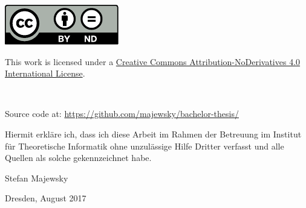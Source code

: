 \documentclass[
 paper=A4,pagesize=automedia,fontsize=12pt,
 BCOR=10mm,DIV=16,
 twoside,headinclude,footinclude=false,
 bibtotocnumbered,          %
 liststotoc,                %
 listsleft,
 pointlessnumbers,          %
 cleardoublepage=empty      %
]{scrbook}
\theoremstyle{plain}
\theoremstyle{definition}
\numberwithin{theorem}{chapter}
\numberwithin{equation}{chapter}
\numberwithin{figure}{chapter}
\numberwithin{table}{chapter}
\begin{document}
\begin{titlepage}
 \vspace*{5em}
 \begin{singlespace}
  \hspace{0.18\linewidth}
  \begin{minipage}{0.1\linewidth}
   \includegraphics[width=\linewidth]{img/by-nd.pdf}
  \end{minipage}
  \hspace{0.02\linewidth}
  \begin{minipage}{0.6\linewidth}\footnotesize\flushleft
   This work is licensed under a \href{https://creativecommons.org/licenses/by-nd/4.0/}{Creative Commons Attribution-NoDerivatives 4.0 International License}.
  \end{minipage}\\[-1em]
  \begin{center}\footnotesize
   Source code at: \url{https://github.com/majewsky/bachelor-thesis/}
  \end{center}
 \end{singlespace}
\end{titlepage}

\cleardoublepage
\tableofcontents
\mainmatter






\backmatter



\clearpage
\thispagestyle{empty}

\vspace*{1.5em}

Hiermit erkläre ich, dass ich diese Arbeit im Rahmen der Betreuung im Institut
für Theoretische Informatik ohne unzulässige Hilfe Dritter verfasst und alle
Quellen als solche gekennzeichnet habe.

\vspace*{15em}

Stefan Majewsky \par
Dresden, {\color{red}August 2017} %
\end{document}
